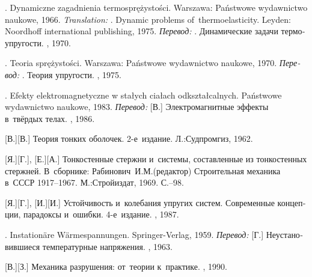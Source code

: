 \begin{thebibliography}{123}
\begin{otherlanguage}{russian}
.
Dynamiczne zagadnienia termosprężystości.
Warsza\-wa: Państwowe wydawnictwo naukowe, 1966. 
\emph{Translation:}
.
Dynamic problems of~thermoelasticity.
Leyden: Noordhoff international publishing, 1975.
\emph{Перевод:}
.
Динамические задачи термоупругости.
\mirpublisher, 1970.

.
Teoria sprężystości.
Warszawa: Państwowe wy\-daw\-nic\-two naukowe, 1970.
\emph{Перевод:}
.
Теория упругости.
\mirpublisher, 1975.

. Efekty elektromagnetyczne w stałych ciałach od\-kształ\-cal\-nych. Państwowe wydawnictwo naukowe, 1983. 
\emph{Перевод:}
[В.] Электромагнитные эффекты в~твёрдых телах. \mirpublisher, 1986. 

[В.][В.] Теория тонких оболочек. 2\hbox{-}е~издание. Л.:\;Судпромгиз, 1962. 

[Я.][Г.], [Е.][А.] Тонкостенные стержни и~системы, составленные из тонкостенных стержней. В~сборнике: Рабинович~И.\:М.\:(редактор) Строительная механика в~СССР 1917\hbox{--}1967. М.:\;Строй\-издат, 1969. С.\hbox{--}98.

[Я.][Г.], [И.][И.] Устойчивость и~колебания упругих систем. Современные концепции, парадоксы и~ошибки. 4\hbox{-}е~издание. \naukapublisher, 1987. 

. Instation\"{a}re W\"{a}rmespannungen. Springer\hbox{-}Verlag, 1959. 
\emph{Перевод:} [Г.] Неустановившиеся температурные напряжения. \fizmatgiz, 1963. 

[В.][З.] Механика разрушения: от~теории к~практике. \naukapublisher, 1990. 


\end{otherlanguage}
\end{thebibliography}
